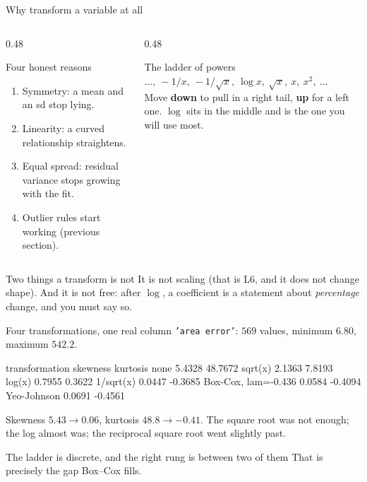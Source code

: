 \documentclass[aspectratio=169]{beamer}
\begin{document}
\begin{frame}[shrink=6]{Why transform a variable at all}
  \begin{columns}[T]
    \begin{column}{0.48\textwidth}
      \begin{block}{Four honest reasons}
        \begin{enumerate}\small
          \item Symmetry: a mean and an sd stop lying.
          \item Linearity: a curved relationship straightens.
          \item Equal spread: residual variance stops growing with the fit.
          \item Outlier rules start working (previous section).
        \end{enumerate}
      \end{block}
    \end{column}
    \begin{column}{0.48\textwidth}
      \begin{exampleblock}{The ladder of powers}
        \small
        $\dots,\ -1/x,\ -1/\sqrt x,\ \log x,\ \sqrt x,\ x,\ x^2,\ \dots$\\[0.3em]
        Move \textbf{down} to pull in a right tail, \textbf{up} for a left
        one. $\log$ sits in the middle and is the one you will use most.
      \end{exampleblock}
    \end{column}
  \end{columns}
  \vspace{0.3em}
  \begin{alertblock}{Two things a transform is not}
    \small It is not scaling (that is L6, and it does not change shape). And it
    is not free: after $\log$, a coefficient is a statement about
    \emph{percentage} change, and you must say so.
  \end{alertblock}
\end{frame}

\begin{frame}[fragile,shrink=6]{Four transformations, one real column}
\texttt{'area error'}: $569$ values, minimum $6.80$, maximum $542.2$.
\begin{outblk}
  transformation        skewness    kurtosis
  none                    5.4328    48.7672
  sqrt(x)                 2.1363     7.8193
  log(x)                  0.7955     0.3622
  1/sqrt(x)               0.0447    -0.3685
  Box-Cox, lam=-0.436     0.0584    -0.4094
  Yeo-Johnson             0.0691    -0.4561
\end{outblk}
\begin{center}\small
  Skewness $5.43 \rightarrow 0.06$, kurtosis $48.8 \rightarrow -0.41$. The
  square root was not enough; the log almost was; the reciprocal square root
  went slightly past.
\end{center}
\begin{alertblock}{The ladder is discrete, and the right rung is between two of them}
  \footnotesize That is precisely the gap Box--Cox fills.
\end{alertblock}
\end{frame}
\end{document}
